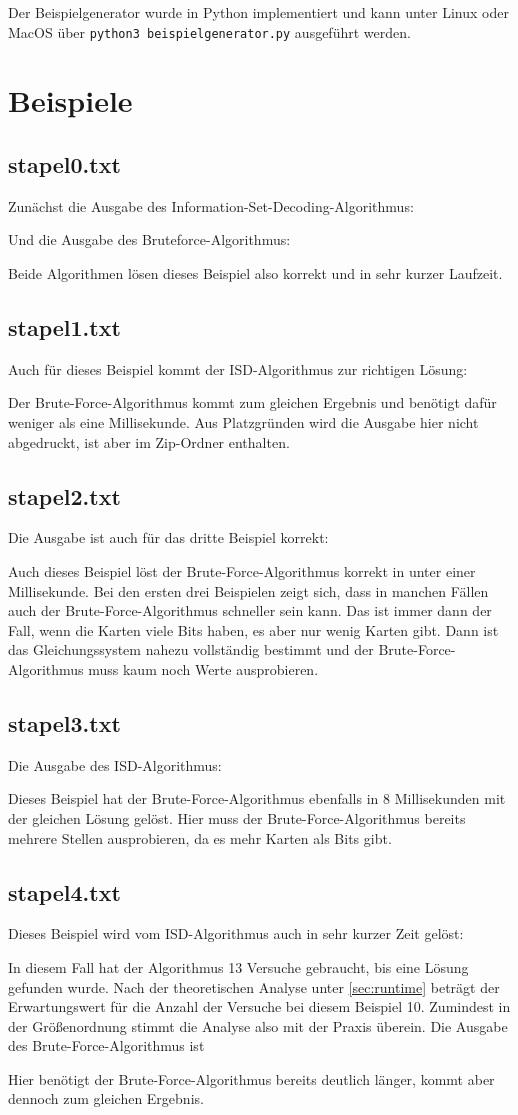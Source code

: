 \documentclass[a4paper,10pt,ngerman]{scrartcl}
\begin{document}
Der Beispielgenerator wurde in Python implementiert und kann unter Linux oder MacOS über \lstinline[language=bash]{python3 beispielgenerator.py} ausgeführt werden.
\section{Beispiele}
\subsection*{stapel0.txt}
Zunächst die Ausgabe des Information-Set-Decoding-Algorithmus: 

Und die Ausgabe des Bruteforce-Algorithmus:

Beide Algorithmen lösen dieses Beispiel also korrekt und in sehr kurzer Laufzeit.
\subsection*{stapel1.txt}
Auch für dieses Beispiel kommt der ISD-Algorithmus zur richtigen Lösung:

Der Brute-Force-Algorithmus kommt zum gleichen Ergebnis und benötigt dafür weniger als eine Millisekunde. Aus Platzgründen wird die Ausgabe hier nicht abgedruckt, ist aber im Zip-Ordner enthalten.
\subsection*{stapel2.txt}
Die Ausgabe ist auch für das dritte Beispiel korrekt:


Auch dieses Beispiel löst der Brute-Force-Algorithmus korrekt in unter einer Millisekunde. Bei den ersten drei Beispielen zeigt sich, dass in manchen Fällen auch der Brute-Force-Algorithmus schneller sein kann. Das ist immer dann der Fall, wenn die Karten viele Bits haben, es aber nur wenig Karten gibt. Dann ist das Gleichungssystem nahezu vollständig bestimmt und der Brute-Force-Algorithmus muss kaum noch Werte ausprobieren. 
\subsection*{stapel3.txt}
Die Ausgabe des ISD-Algorithmus:

Dieses Beispiel hat der Brute-Force-Algorithmus ebenfalls in 8 Millisekunden mit der gleichen Lösung gelöst.
Hier muss der Brute-Force-Algorithmus bereits mehrere Stellen ausprobieren, da es mehr Karten als Bits gibt.
\subsection*{stapel4.txt}
Dieses Beispiel wird vom ISD-Algorithmus auch in sehr kurzer Zeit gelöst:

In diesem Fall hat der Algorithmus 13 Versuche gebraucht, bis eine Lösung gefunden wurde. Nach der theoretischen Analyse unter \ref{sec:runtime} beträgt der Erwartungswert für die Anzahl der Versuche bei diesem Beispiel 10. Zumindest in der Größenordnung stimmt die Analyse also mit der Praxis überein. 
Die Ausgabe des Brute-Force-Algorithmus ist

Hier benötigt der Brute-Force-Algorithmus bereits deutlich länger, kommt aber dennoch zum gleichen Ergebnis. 
\end{document}
